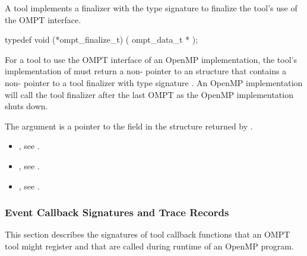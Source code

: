 \label{sec:ompt_finalize_t}

\summary
A tool implements a finalizer with the type signature
 to finalize the tool's use of
the OMPT interface.

\format

\begin{ccppspecific}
\begin{omptInquiry}
typedef void (*ompt_finalize_t) (
  ompt_data_t *
);
\end{omptInquiry}
\end{ccppspecific}


\descr
For a tool to use the OMPT interface of an OpenMP implementation,
the tool's implementation of  must return a
non- pointer to an
 structure that contains a
non- pointer to a tool finalizer with
type signature .
An OpenMP implementation will call the tool finalizer
after the last OMPT  as the OpenMP implementation shuts down.

\argdesc
The argument  is a pointer to the
 field in the 
structure returned by .

\crossreferences
\begin{itemize}
\item {}, see
  .
\item {}, see .
\item {}, see .
\end{itemize}


\subsubsection{Event Callback Signatures and Trace Records}
\label{sec:ToolsSupport_callback_signatures}

This section describes the signatures of tool callback functions that an OMPT
tool might register and that are called during runtime of an OpenMP program.

\label{sec:ompt_callback_thread_begin_t}
\format

